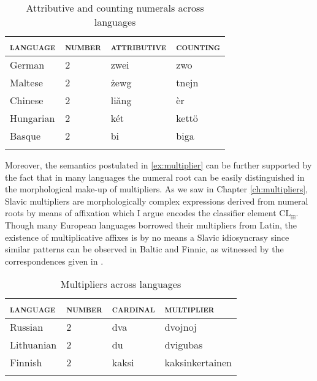 	\begin{table}[h]
		\centering
		\begin{tabular}{llll}
			\lsptoprule
			\textsc{language}  & \textsc{number} & \textsc{attributive} & \textsc{counting} \\ \midrule
			German    & 2      & zwei                 & zwo             \\
			Maltese   & 2      & żewg                 & tnejn            \\
			Chinese   & 2      & li{\v{a}}ng          & {\`{e}}r         \\
			Hungarian & 2      & két                  & kettö            \\
			Basque    & 2      & bi                   & biga             \\ \lspbottomrule
		\end{tabular}
        \caption{Attributive and counting numerals across languages \citep{hurford2001languages}}
		\label{tab:attributive-counting-numerals-across-languages}
	\end{table}

	Moreover, the semantics postulated in \ref{ex:multiplier} can be further supported by the fact that in many languages the numeral root can be easily distinguished in the morphological make-up of multipliers. As we saw in Chapter \ref{ch:multipliers}, Slavic multipliers are morphologically complex expressions derived from numeral roots by means of affixation which I argue encodes the classifier element CL$_\boxplus$. Though many European languages borrowed their multipliers from Latin, the existence of multiplicative affixes is by no means a Slavic idiosyncrasy since similar patterns can be observed in Baltic and Finnic, as witnessed by the correspondences given in .

	\begin{table}[h]
		\centering
		\begin{tabular}{llll}
			\lsptoprule
			\textsc{language}  & \textsc{number} & \textsc{cardinal} & \textsc{multiplier} \\ \midrule
			Russian   & 2 & dva      & dvojnoj                \\
			Lithuanian    & 2 & du      & dvigubas                   \\
			Finnish & 2 & kaksi      & kaksinkertainen                  \\ \lspbottomrule
		\end{tabular}
        \caption{Multipliers across languages}
		\label{tab:multipliers-across-languages}
	\end{table}

